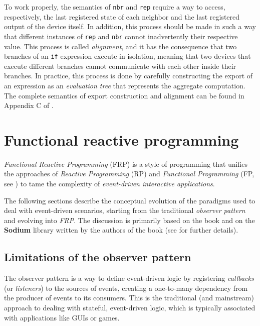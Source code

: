 To work properly, the semantics of \texttt{nbr} and \texttt{rep} require a way to access, respectively, the last registered state of each neighbor and the last registered output of the device itself.
%
In addition, this process should be made in such a way that different instances of \texttt{rep} and \texttt{nbr} cannot inadvertently  their respective value.
%
This process is called \textit{alignment}, and it has the consequence that two branches of an \texttt{if} expression execute in isolation, meaning that two devices that execute different branches cannot communicate with each other inside their branches.
%
In practice, this process is done by carefully constructing the export of an expression as an \textit{evaluation tree} that represents the aggregate computation.
%
The complete semantics of export construction and alignment can be found in Appendix C of \cite{10.1145/3177774}.

\section{Functional reactive programming}
\label{sec:frp}

\textit{Functional Reactive Programming} (FRP) is a style of programming that unifies the approaches of \textit{Reactive Programming} (RP) and \textit{Functional Programming} (FP, see ) to tame the complexity of \textit{event-driven interactive applications}.

The following sections describe the conceptual evolution of the paradigms used to deal with event-driven scenarios, starting from the traditional \textit{observer pattern} and evolving into \textit{FRP}.
%
The discussion is primarily based on the book \cite{blackheath2016functional} and on the \textbf{Sodium} library written by the authors of the book (see  for further details).

\subsection{Limitations of the observer pattern}
\label{sec:observer}

The observer pattern is a way to define event-driven logic by registering \textit{callbacks} (or \textit{listeners}) to the sources of events, creating a one-to-many dependency from the producer of events to its consumers.
%
This is the traditional (and mainstream) approach to dealing with stateful, event-driven logic, which is typically associated with applications like GUIs or games.

